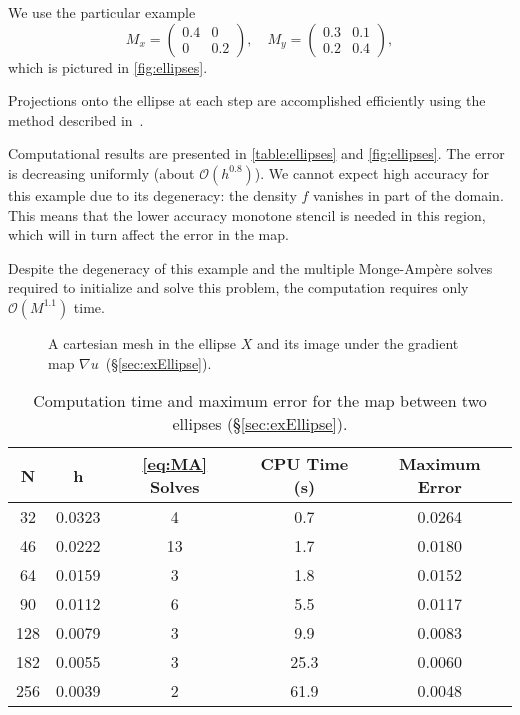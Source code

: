 \documentclass{amsart}
\theoremstyle{lemma}
\theoremstyle{remark}
\begin{document}
We use the particular example
\[ M_x = \left(\begin{array}{cc}0.4 & 0\\0 & 0.2 \end{array}\right) , 
\quad M_y = \left(\begin{array}{cc} 0.3 & 0.1\\0.2 & 0.4\end{array}\right),\]
which is pictured in \autoref{fig:ellipses}.  

Projections onto the ellipse at each step are accomplished efficiently using the method described in~\cite{KiselevProject}.

Computational results are presented in \autoref{table:ellipses} and \autoref{fig:ellipses}.  The error is decreasing uniformly (about ${\mathcal{O}}(h^{0.8})$).  We cannot expect high accuracy for this example due to its degeneracy: the density $f$ vanishes in part of the domain.  This means that the lower accuracy monotone stencil is needed in this region, which will in turn affect the error in the map.

Despite the degeneracy of this example and the multiple {{Monge-Amp\`ere}\xspace} solves required to initialize and solve this problem, the computation requires only  ${\mathcal{O}}(M^{1.1})$ time. 

\begin{figure}[htdp]
	\centering
  	\vspace*{-12pt}\caption{ A cartesian mesh in the ellipse $X$ and  its image under the gradient map $\nabla u$~(\S\ref{sec:exEllipse}).}
  	\label{fig:ellipses}
\end{figure} 

\begin{table}[htdp]\small
\begin{center}
\begin{tabular}{ccccc}
N  & h & \eqref{eq:MA} Solves & CPU Time (s) & {Maximum Error} \\
\hline
32 & 0.0323 & 4 & 0.7 &  0.0264\\
46 & 0.0222 & 13 & 1.7 &  0.0180\\
64 & 0.0159 &  3 & 1.8 & 0.0152\\
90 & 0.0112 &  6 & 5.5 & 0.0117\\
128 & 0.0079 & 3 & 9.9 & 0.0083\\
182 & 0.0055 & 3 & 25.3 & 0.0060\\
256 & 0.0039 & 2 & 61.9 & 0.0048
\end{tabular}
\end{center}
\caption{Computation time and maximum error for the map between two ellipses (\S\ref{sec:exEllipse}).}
\label{table:ellipses}
\end{table}
\end{document}
